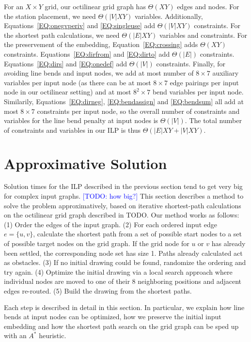 \documentclass{sig-alternate-sigmod09}
\newcommand\TODO[1]{\textcolor{blue}{\small [TODO: #1]}}
\begin{document}
For an $X \times Y$ grid, our octilinear grid graph has $\Theta(XY)$ edges and nodes.
For the station placement, we need ${\Theta}(|V|XY)$ variables.
Additionally, Equations~\ref{EQ:onegvperiv} and \ref{EQ:singleuse} add ${\Theta}(|V|XY)$ constraints.
For the shortest path calculations, we need ${\Theta}(|E|XY)$ variables and constraints.
For the preservement of the embedding, Equation~\ref{EQ:crossing} adds ${\Theta}(XY)$ constraints.
Equations~\ref{EQ:dirfrom} and \ref{EQ:dirto} add ${\Theta}(|E|)$ constraints.
Equations~\ref{EQ:dirs} and \ref{EQ:onedef} add ${\Theta}(|V|)$ constraints.
Finally, for avoiding line bends and input nodes, we add at most number of $8\times7$ auxiliary variables per input node (as there can be at most $8\times7$ edge pairings per input node in our octilinear setting) and at most $8^2\times7$ bend variables per input node.
Similarily, Equations~\ref{EQ:dirneg}, \ref{EQ:bendassign} and \ref{EQ:bendsum} all add at most $8\times7$ constraints per input node, so the overall number of constraints and variables for the line bend penalty at input nodes is ${\Theta}(|V|)$.
The total number of constraints and variables in our ILP is thus ${\Theta}(|E|XY + |V|XY)$.

\section{Approximative Solution}

Solution times for the ILP described in the previous section tend to get very big for complex input graphs. \TODO{how big?}
This section describes a method to solve the problem approximatively, based on iterative shortest-path calculations on the octilinear grid graph described in TODO.
Our method works as follows:
  (1) Order the edges of the input graph.
  (2) For each ordered input edge $e = \{u, v\}$, calculate the shortest path from a set of possible start nodes to a set of possible target nodes on the grid graph. If the grid node for $u$ or $v$ has already been settled, the corresponding node set has size 1. Paths already calculated act as obstacles.
  (3) If no initial drawing could be found, randomize the ordering and try again.
  (4) Optimize the initial drawing via a local search approach where individual nodes are moved to one of their 8 neighboring positions and adjacent edges re-routed.
  (5) Build the drawing from the shortest paths.

Each step is described in detail in this section.
In particular, we explain how line bends at input nodes can be optimized, how we preserve the initial input embedding and how the shortest path search on the grid graph can be sped up with an $A^*$ heuristic.
\end{document}
